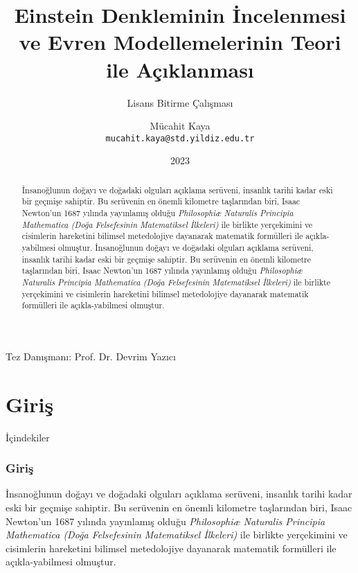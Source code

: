 \documentclass{beamer}
\title{Einstein Denkleminin İncelenmesi ve Evren Modellemelerinin Teori ile Açıklanması}
\institute{Yıldız Teknik Üniversitesi Fizik Bölümü}
\date{2023}
\author[kaya-m]{Mücahit Kaya \\ \texttt{mucahit.kaya@std.yildiz.edu.tr}}
\subtitle{Lisans Bitirme Çalışması}
\begin{document}
\begin{frame}
    \titlepage
    Tez Danışmanı: Prof. Dr. Devrim Yazıcı
\end{frame}


\begin{frame}
    \begin{abstract}
        İnsanoğlunun doğayı ve doğadaki olguları açıklama serüveni, insanlık tarihi kadar eski bir geçmişe sahiptir. Bu serüvenin en önemli kilometre taşlarından biri, Isaac Newton'un 1687 yılında yayınlamış olduğu \textit{Philosophiæ Naturalis Principia Mathematica (Doğa Felsefesinin Matematiksel İlkeleri)} ile birlikte yerçekimini ve cisimlerin hareketini bilimsel metedolojiye dayanarak matematik formülleri ile açıkla-yabilmesi olmuştur.         İnsanoğlunun doğayı ve doğadaki olguları açıklama serüveni, insanlık tarihi kadar eski bir geçmişe sahiptir. Bu serüvenin en önemli kilometre taşlarından biri, Isaac Newton'un 1687 yılında yayınlamış olduğu \textit{Philosophiæ Naturalis Principia Mathematica (Doğa Felsefesinin Matematiksel İlkeleri)} ile birlikte yerçekimini ve cisimlerin hareketini bilimsel metedolojiye dayanarak matematik formülleri ile açıkla-yabilmesi olmuştur. 
    \end{abstract}
\end{frame}



\section{Giriş}
     
    \begin{frame}{İçindekiler}
        \tableofcontents[currentsection]
    \end{frame}


    \begin{frame}
        \frametitle{Giriş}       
        İnsanoğlunun doğayı ve doğadaki olguları açıklama serüveni, insanlık tarihi kadar eski bir geçmişe sahiptir. Bu serüvenin en önemli kilometre taşlarından biri, Isaac Newton'un 1687 yılında yayınlamış olduğu \textit{Philosophiæ Naturalis Principia Mathematica (Doğa Felsefesinin Matematiksel İlkeleri)} ile birlikte yerçekimini ve cisimlerin hareketini bilimsel metedolojiye dayanarak matematik formülleri ile açıkla-yabilmesi olmuştur. 
    \end{frame}
\end{document}
